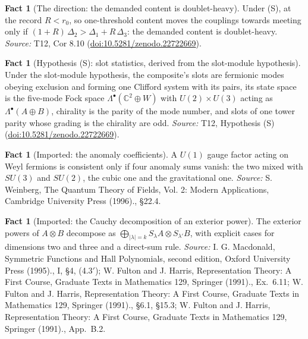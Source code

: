 \documentclass[11pt]{article}
\theoremstyle{definition}
\newtheorem{fact}[theorem]{Fact}
\theoremstyle{plain}
\providecommand{\C}{}\renewcommand{\C}{\mathbb{C}}
\providecommand{\Dl}{}\renewcommand{\Dl}{\Delta}
\begin{document}
\begin{fact}[The direction: the demanded content is doublet-heavy]\label{c:standard-model.direction-demanded-content-doublet-heavy}
Under (S), at the record $R < r_{0}$, so one-threshold content moves the couplings towards meeting only if $(1 + R)\,\Dl_{2} > \Dl_{1} + R\,\Dl_{3}$: the demanded content is doublet-heavy.
\emph{Source:} T12, Cor 8.10 (\href{https://doi.org/10.5281/zenodo.22722669}{doi:10.5281/zenodo.22722669}).
\end{fact}

\begin{fact}[Hypothesis (S): slot statistics, derived from the slot-module hypothesis]\label{c:standard-model.hyp-s-slot-statistics}
Under the slot-module hypothesis, the composite's slots are fermionic modes obeying exclusion and forming one Clifford system with its pairs, its state space is the five-mode Fock space $\Lambda^{\bullet}(\C^{2} \oplus W)$ with $U(2) \times U(3)$ acting as $\Lambda^{\bullet}(A \oplus B)$, chirality is the parity of the mode number, and slots of one tower parity whose grading is the chirality are odd.
\emph{Source:} T12, Hypothesis (S) (\href{https://doi.org/10.5281/zenodo.22722669}{doi:10.5281/zenodo.22722669}).
\end{fact}

\begin{fact}[Imported: the anomaly coefficients]\label{c:standard-model.imported-anomaly-coefficients}
A $U(1)$ gauge factor acting on Weyl fermions is consistent only if four anomaly sums vanish: the two mixed with $SU(3)$ and $SU(2)$, the cubic one and the gravitational one.
\emph{Source:} S. Weinberg, The Quantum Theory of Fields, Vol. 2: Modern Applications, Cambridge University Press (1996)., \S 22.4.
\end{fact}

\begin{fact}[Imported: the Cauchy decomposition of an exterior power]\label{c:standard-model.imported-cauchy-decomposition-exterior-power}
The exterior powers of $A \otimes B$ decompose as $\bigoplus_{|\lambda| = k} S_{\lambda}A \otimes S_{\lambda'}B$, with explicit cases for dimensions two and three and a direct-sum rule.
\emph{Source:} I. G. Macdonald, Symmetric Functions and Hall Polynomials, second edition, Oxford University Press (1995)., I, \S 4, (4.3$'$); W. Fulton and J. Harris, Representation Theory: A First Course, Graduate Texts in Mathematics 129, Springer (1991)., Ex.~6.11; W. Fulton and J. Harris, Representation Theory: A First Course, Graduate Texts in Mathematics 129, Springer (1991)., \S 6.1, \S 15.3; W. Fulton and J. Harris, Representation Theory: A First Course, Graduate Texts in Mathematics 129, Springer (1991)., App.~B.2.
\end{fact}
\end{document}
